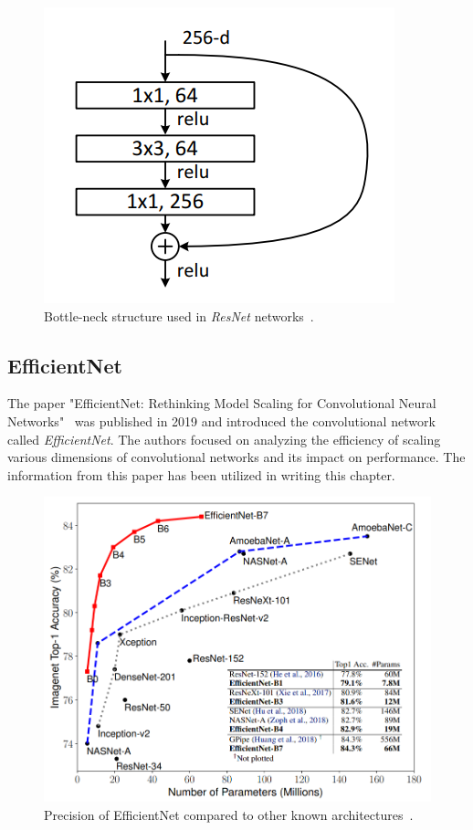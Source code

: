 \begin{figure}[!htb]
    \centering
    \includegraphics[scale=0.5]{Images/bottle-neck.png}
    \caption{Bottle-neck structure used in \textit{ResNet} networks~\cite{DeepResidualLearning}.}
    \label{fig:bottleNeck}
\end{figure}


\subsection{EfficientNet}

The paper "EfficientNet: Rethinking Model Scaling for Convolutional Neural Networks"~\cite{EfficientNet} was published in 2019 and introduced the convolutional network called \textit{EfficientNet}. The authors focused on analyzing the efficiency of scaling various dimensions of convolutional networks and its impact on performance. The information from this paper has been utilized in writing this chapter.

\begin{figure}[!htb]
    \centering
    \includegraphics[scale=0.45]{Images/efficient-net-accuracy.png}
    \caption{Precision of EfficientNet compared to other known architectures~\cite{EfficientNet}.}
    \label{fig:efficientNet}
\end{figure}

